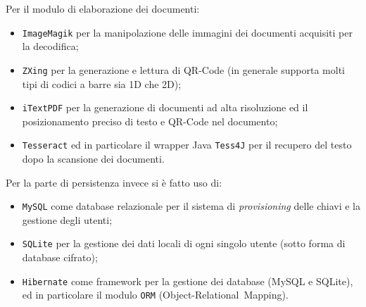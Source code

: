 Per il modulo di elaborazione dei documenti:
\begin{itemize}
	\item \texttt{ImageMagik} per la manipolazione delle immagini dei documenti acquisiti per la decodifica;
	\item \texttt{ZXing} per la generazione e lettura di QR-Code (in generale supporta molti tipi di codici a barre sia 1D che 2D);
	\item \texttt{iTextPDF} per la generazione di documenti ad alta risoluzione ed il posizionamento preciso di testo e QR-Code nel documento;
	\item \texttt{Tesseract} ed in particolare il wrapper Java \texttt{Tess4J} per il recupero del testo dopo la scansione dei documenti.
\end{itemize}

Per la parte di persistenza invece si è fatto uso di:
\begin{itemize}
	\item \texttt{MySQL} come database relazionale per il sistema di \emph{provisioning} delle chiavi e la gestione degli utenti;
	\item \texttt{SQLite} per la gestione dei dati locali di ogni singolo utente (sotto forma di database cifrato);
	\item \texttt{Hibernate} come framework per la gestione dei database (MySQL e SQLite), ed in particolare il modulo \texttt{ORM} (Object-Relational~Mapping).
\end{itemize}